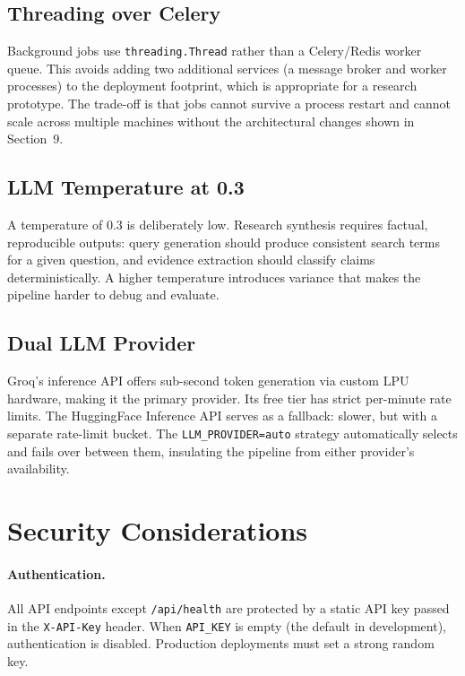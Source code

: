 \documentclass[10pt, twocolumn]{article}
\begin{document}
\subsection{Threading over Celery}

Background jobs use \texttt{threading.Thread} rather than a Celery/Redis
worker queue. This avoids adding two additional services (a message broker and
worker processes) to the deployment footprint, which is appropriate for a
research prototype. The trade-off is that jobs cannot survive a process restart
and cannot scale across multiple machines without the architectural changes
shown in Section~9.

\subsection{LLM Temperature at 0.3}

A temperature of 0.3 is deliberately low. Research synthesis requires
factual, reproducible outputs: query generation should produce consistent
search terms for a given question, and evidence extraction should classify
claims deterministically. A higher temperature introduces variance that makes
the pipeline harder to debug and evaluate.

\subsection{Dual LLM Provider}

Groq's inference API offers sub-second token generation via custom LPU
hardware, making it the primary provider. Its free tier has strict per-minute
rate limits. The HuggingFace Inference API serves as a fallback: slower, but
with a separate rate-limit bucket. The \texttt{LLM\_PROVIDER=auto} strategy
automatically selects and fails over between them, insulating the pipeline from
either provider's availability.

\section{Security Considerations}

\paragraph{Authentication.}
All API endpoints except \texttt{/api/health} are protected by a static API
key passed in the \texttt{X-API-Key} header. When \texttt{API\_KEY} is empty
(the default in development), authentication is disabled. Production deployments
must set a strong random key.
\end{document}
